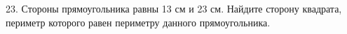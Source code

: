 23. Стороны прямоугольника равны 13 см и 23 см. Найдите сторону квадрата, периметр которого равен периметру данного прямоугольника.\\
